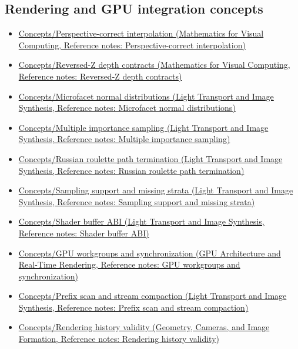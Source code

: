 \subsection{Rendering and GPU integration concepts}\label{appendix-a6d556a4ef50-rendering-and-gpu-integration-concepts}

\hypertarget{appendix-a6d556a4ef50-rendering-and-gpu-integration-concepts}{}

\begin{itemize}
\tightlist
\item
  \href{../02-Mathematics-for-Visual-Computing/main.pdf\#nameddest=appendix-1ed5f96c73ea}{Concepts/Perspective-correct interpolation (Mathematics for Visual Computing, Reference notes: Perspective-correct interpolation)}
\item
  \href{../02-Mathematics-for-Visual-Computing/main.pdf\#nameddest=appendix-275ec8847057}{Concepts/Reversed-Z depth contracts (Mathematics for Visual Computing, Reference notes: Reversed-Z depth contracts)}
\item
  \href{../04-Light-Transport-and-Image-Synthesis/main.pdf\#nameddest=appendix-885c1cb64ae9}{Concepts/Microfacet normal distributions (Light Transport and Image Synthesis, Reference notes: Microfacet normal distributions)}
\item
  \href{../04-Light-Transport-and-Image-Synthesis/main.pdf\#nameddest=appendix-ca8898faf1a6}{Concepts/Multiple importance sampling (Light Transport and Image Synthesis, Reference notes: Multiple importance sampling)}
\item
  \href{../04-Light-Transport-and-Image-Synthesis/main.pdf\#nameddest=appendix-7277c62d4599}{Concepts/Russian roulette path termination (Light Transport and Image Synthesis, Reference notes: Russian roulette path termination)}
\item
  \href{../04-Light-Transport-and-Image-Synthesis/main.pdf\#nameddest=appendix-10308c3d753e}{Concepts/Sampling support and missing strata (Light Transport and Image Synthesis, Reference notes: Sampling support and missing strata)}
\item
  \href{../04-Light-Transport-and-Image-Synthesis/main.pdf\#nameddest=appendix-749048795dbb}{Concepts/Shader buffer ABI (Light Transport and Image Synthesis, Reference notes: Shader buffer ABI)}
\item
  \href{../06-GPU-Architecture-and-Real-Time-Rendering/main.pdf\#nameddest=appendix-f662b5b1773b}{Concepts/GPU workgroups and synchronization (GPU Architecture and Real-Time Rendering, Reference notes: GPU workgroups and synchronization)}
\item
  \href{../04-Light-Transport-and-Image-Synthesis/main.pdf\#nameddest=appendix-f2ee4d086415}{Concepts/Prefix scan and stream compaction (Light Transport and Image Synthesis, Reference notes: Prefix scan and stream compaction)}
\item
  \href{../03-Geometry-Cameras-and-Image-Formation/main.pdf\#nameddest=appendix-2e7e9fd28a2c}{Concepts/Rendering history validity (Geometry, Cameras, and Image Formation, Reference notes: Rendering history validity)}
\end{itemize}

